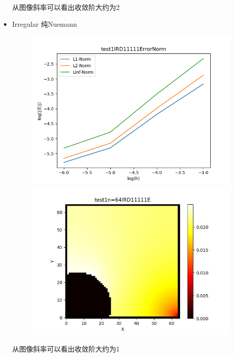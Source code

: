 \documentclass{article}
\begin{document}
\begin{itemize}
    从图像斜率可以看出收敛阶大约为2
    \newpage
    \item Irregular 纯Nuemann
    \begin{figure}[h]
        \centering
        \includegraphics[width=0.35\linewidth]{test1IRD11111ErrorNormjpg.png}
        \includegraphics[width=0.35\linewidth]{test1n=64IRD11111E.jpg}
    \end{figure}

    从图像斜率可以看出收敛阶大约为1
\end{itemize}
\end{document}
